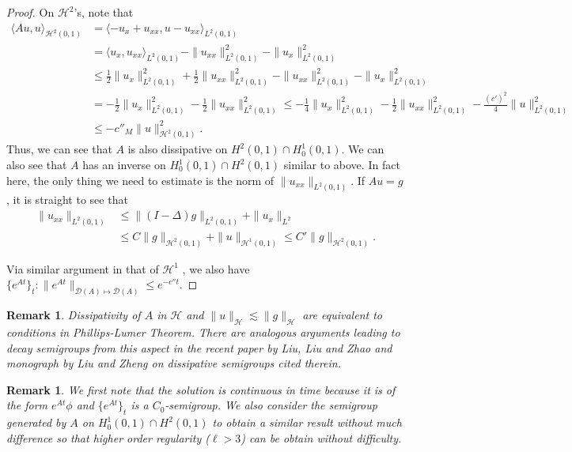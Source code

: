 \documentclass[10pt,a4paper,final]{article}
\numberwithin{equation}{section}
\newtheorem{remark}[theorem]{Remark}
\newcommand{\cH}{\mathcal{H}}
\begin{document}
\begin{proof}
On $\cH^2$'s, note that 
\begin{align*}
    \langle Au,u\rangle_{\cH^{2}(0,1)}&=\langle-u_x+u_{xx},u-u_{xx}\rangle_{L^2(0,1)}\\
    &=\langle u_x,u_{xx}\rangle_{L^2(0,1)}-\|u_{xx}\|_{L^2(0,1)}^2-\|u_{x}\|^2_{L^2(0,1)}\\
    &\leq \frac{1}{2}\|u_x\|_{L^2(0,1)}^2+\frac{1}{2}\|u_{xx}\|^2_{L^2(0,1)}-\|u_{xx}\|_{L^2(0,1)}^2-\|u_{x}\|^2_{L^2(0,1)}\\
    &=-\frac{1}{2}\|u_x\|^2_{L^2(0,1)}-\frac{1}{2}\|u_{xx}\|^2_{L^2(0,1)}\leq -\frac{1}{4}\|u_x\|_{L^2(0,1)}^2-\frac{1}{2}\|u_{xx}\|_{L^2(0,1)}^2-\frac{(c')^2}{4}\|u\|^2_{L^2(0,1)}\\
    &\leq-c''_M\|u\|^2_{\cH^2(0,1)}.
\end{align*}
Thus, we can see that $A$ is also dissipative on $H^2(0,1)\cap H^1_0(0,1)$. We can also see that $A$ has an inverse on $H^1_0(0,1)\cap H^2(0,1)$ similar to above. In fact here, the only thing we need to estimate is the norm of $\|u_{xx}\|_{L^2(0,1)}$. If $Au=g$, it is straight to see that 
\begin{align*}
    \|u_{xx}\|_{L^2(0,1)}&\leq \|(I-\Delta)g\|_{L^2(0,1)}+\|u_x\|_{L^2}\\
    &\leq C\|g\|_{\cH^2(0,1)}+\|u\|_{\cH^1(0,1)}\leq C'\|g\|_{\cH^2(0,1)}.
\end{align*}

Via similar argument in that of $\cH^1$ , we also have  $\{e^{At}\}_{t}: \|e^{At}\|_{\mathcal{D}(A)\mapsto \mathcal{D}(A)}\leq e^{-c''t}.$

\end{proof}

\begin{remark}\label{Re3-2}
 Dissipativity of $A$ in $\cH$ and $\|u\|_{\cH}\lesssim \|g\|_{\cH}$ are equivalent to conditions in Phillips-Lumer Theorem. There are analogous arguments leading to decay semigroups from this aspect in the recent paper \cite{Liu} by Liu, Liu and Zhao and monograph \cite{LZ} by Liu and Zheng on dissipative semigroups cited therein.\\
\end{remark}

\begin{remark}
We first note that the solution is continuous in time because it is of the form $e^{At}\phi$ and $\{ e^{At}\}_t$ is a $C_0$-semigroup. {We also consider the semigroup generated by $A$ on $H^1_0(0,1)\cap H^2(0,1)$ to obtain a similar result without much difference so that higher order regularity ($\ell>3$) can be obtain without difficulty.}
\end{remark}
\end{document}
